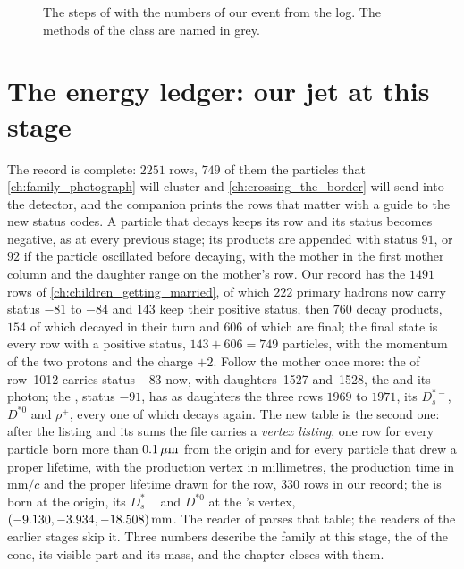 \begin{figure}[htbp]\centering
\resizebox{\textwidth}{!}{}
\caption[The hadron-decay stage as a flow chart]{The steps of
 with the numbers of our event from the
 log. The methods of the  class are named in grey.}
\label{fig:children_producing_grandchildren:flow}
\end{figure}

\section{The energy ledger: our jet at this stage}
\label{sec:children_producing_grandchildren:our_jet_at_this_stage}

The record is complete: $2251$ rows, $749$ of them the particles that
\cref{ch:family_photograph} will cluster and \cref{ch:crossing_the_border}
will send into the detector, and the companion prints the rows that matter
with a guide to the new status codes.
\label{sec:children_producing_grandchildren:record_format}
A particle that decays keeps its row and its status becomes negative, as at
every previous stage; its products are appended with status $91$, or $92$
if the particle oscillated before decaying, with the mother in the first
mother column and the daughter range on the mother's row. Our record has
the $1491$ rows of \cref{ch:children_getting_married}, of which $222$
primary hadrons now carry status $-81$ to $-84$ and $143$ keep their
positive status, then $760$ decay products, $154$ of which decayed in their
turn and $606$ of which are final; the final state is every row with a
positive status, $143+606=749$ particles, with the momentum of the two
protons and the charge $+2$. Follow the mother once more: the \Bstarbar of
row~1012 carries status $-83$ now, with daughters~1527 and~1528, the \Bbar
and its photon; the \Bbar, status $-91$, has as daughters the three rows
$1969$ to $1971$, its $D_s^{*-}$, $D^{*0}$ and $\rho^+$, every one of which
decays again. The new table is the second one: after the listing and its
sums the file carries a \emph{vertex listing}, one row for every particle
born more than $0.1\,\mu\mathrm{m}$ from the origin and for every particle that drew a
proper lifetime, with the production vertex in millimetres, the production
time in $\mathrm{mm}/c$ and the proper lifetime drawn for the row, $330$
rows in our record; the \Bbar is born at the origin, its $D_s^{*-}$ and
$D^{*0}$ at the \Bbar's vertex, $(-9.130,-3.934,-18.508)\,\mathrm{mm}$. The reader of
 parses that table; the readers of the earlier
stages skip it. Three numbers describe the family at this stage, the \pt
of the cone, its visible part and its mass, and the chapter closes with
them.

